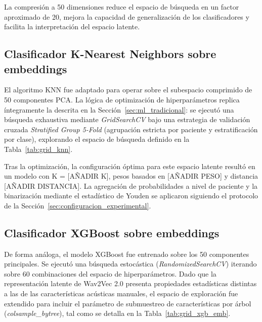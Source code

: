 La compresión a 50 dimensiones reduce el espacio de búsqueda en un factor aproximado de 20, mejora la capacidad de generalización de los clasificadores y facilita la interpretación del espacio latente.

\subsection{Clasificador K-Nearest Neighbors sobre embeddings}

El algoritmo KNN fue adaptado para operar sobre el subespacio comprimido de 50 componentes PCA. La lógica de optimización de hiperparámetros replica íntegramente la descrita en la Sección~\ref{sec:ml_tradicional}: se ejecutó una búsqueda exhaustiva mediante \textit{GridSearchCV} bajo una estrategia de validación cruzada \textit{Stratified Group 5-Fold} (agrupación estricta por paciente y estratificación por clase), explorando el espacio de búsqueda definido en la Tabla~\ref{tab:grid_knn}.

Tras la optimización, la configuración óptima para este espacio latente resultó en un modelo con K = [AÑADIR K], pesos basados en [AÑADIR PESO] y distancia [AÑADIR DISTANCIA]. La agregación de probabilidades a nivel de paciente y la binarización mediante el estadístico de Youden \cite{youden1950} se aplicaron siguiendo el protocolo de la Sección~\ref{sec:configuracion_experimental}.

\subsection{Clasificador XGBoost sobre embeddings}

De forma análoga, el modelo XGBoost fue entrenado sobre los 50 componentes principales. Se ejecutó una búsqueda estocástica (\textit{RandomizedSearchCV}) iterando sobre 60 combinaciones del espacio de hiperparámetros. Dado que la representación latente de Wav2Vec 2.0 presenta propiedades estadísticas distintas a las de las características acústicas manuales, el espacio de exploración fue extendido para incluir el parámetro de submuestreo de características por árbol (\textit{colsample\_bytree}), tal como se detalla en la Tabla~\ref{tab:grid_xgb_emb}.

